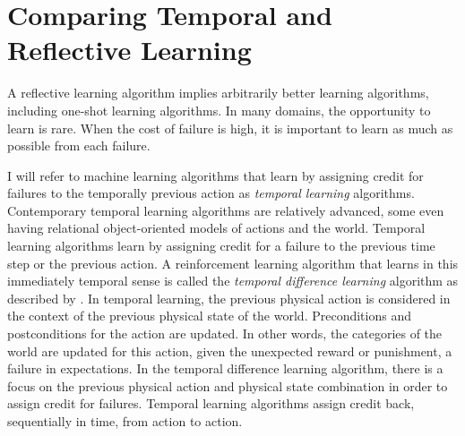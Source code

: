 \section{Comparing Temporal and Reflective Learning}

A reflective learning algorithm implies arbitrarily better learning
algorithms, including one-shot learning algorithms.  In many domains,
the opportunity to learn is rare.  When the cost of failure is high,
it is important to learn as much as possible from each failure.

I will refer to machine learning algorithms that learn by assigning
credit for failures to the temporally previous action as
\emph{temporal learning} algorithms.  Contemporary temporal learning
algorithms are relatively advanced, some even having relational
object-oriented models of actions and the world.  Temporal learning
algorithms learn by assigning credit for a failure to the previous
time step or the previous action.  A reinforcement learning algorithm
that learns in this immediately temporal sense is called the
\emph{temporal difference learning} algorithm as described by
\cite*{kaelbling:1996}.  In temporal learning, the previous physical
action is considered in the context of the previous physical state of
the world.  Preconditions and postconditions for the action are
updated.  In other words, the categories of the world are updated for
this action, given the unexpected reward or punishment, a failure in
expectations.  In the temporal difference learning algorithm, there is
a focus on the previous physical action and physical state combination
in order to assign credit for failures.  Temporal learning algorithms
assign credit back, sequentially in time, from action to action.

